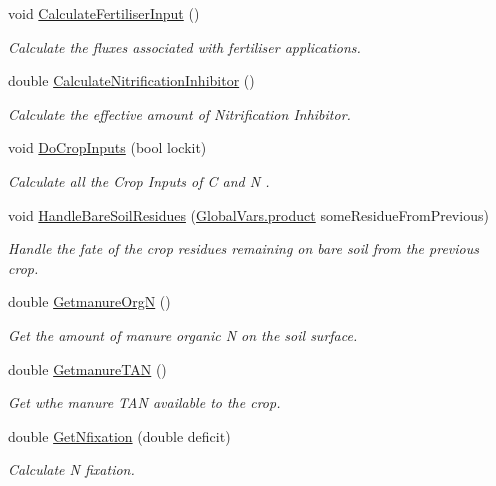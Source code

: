 \begin{DoxyCompactItemize}
void \mbox{\hyperlink{class_crop_class_a8266c04c74b6f19d1f58073acc18b3a5}{Calculate\+Fertiliser\+Input}} ()
\begin{DoxyCompactList}\small\item\em Calculate the fluxes associated with fertiliser applications. \end{DoxyCompactList}\item 
double \mbox{\hyperlink{class_crop_class_a331622d69775779cd0865a7ee675f8cd}{Calculate\+Nitrification\+Inhibitor}} ()
\begin{DoxyCompactList}\small\item\em Calculate the effective amount of Nitrification Inhibitor. \end{DoxyCompactList}\item 
void \mbox{\hyperlink{class_crop_class_ab2d8d3cbf83e1dacd6e57f02199b4e5d}{Do\+Crop\+Inputs}} (bool lockit)
\begin{DoxyCompactList}\small\item\em Calculate all the Crop Inputs of C and N . \end{DoxyCompactList}\item 
void \mbox{\hyperlink{class_crop_class_ab6c8a1cbfc2dd57c34344081cc6c9ed4}{Handle\+Bare\+Soil\+Residues}} (\mbox{\hyperlink{class_global_vars_1_1product}{Global\+Vars.\+product}} some\+Residue\+From\+Previous)
\begin{DoxyCompactList}\small\item\em Handle the fate of the crop residues remaining on bare soil from the previous crop. \end{DoxyCompactList}\item 
double \mbox{\hyperlink{class_crop_class_a88bcd4b2bad88a2c0269e456eef3bf59}{Getmanure\+OrgN}} ()
\begin{DoxyCompactList}\small\item\em Get the amount of manure organic N on the soil surface. \end{DoxyCompactList}\item 
double \mbox{\hyperlink{class_crop_class_af24daf4f7c4f8da19d3c40c4d008b657}{Getmanure\+T\+AN}} ()
\begin{DoxyCompactList}\small\item\em Get wthe manure T\+AN available to the crop. \end{DoxyCompactList}\item 
double \mbox{\hyperlink{class_crop_class_acc491b6f718ea6965eeb1a93228176b3}{Get\+Nfixation}} (double deficit)
\begin{DoxyCompactList}\small\item\em Calculate N fixation. \end{DoxyCompactList}\item 

\end{DoxyCompactItemize}
